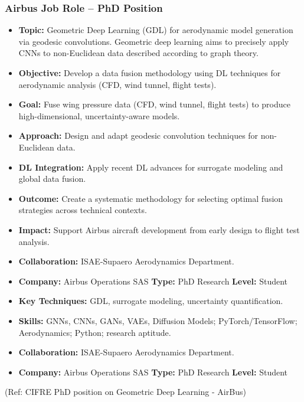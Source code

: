 \begin{frame}[fragile]\frametitle{Airbus Job Role – PhD Position}
  \begin{itemize}
    \item \textbf{Topic:} Geometric Deep Learning (GDL) for aerodynamic model generation via geodesic convolutions. Geometric deep learning aims to precisely apply CNNs to non-Euclidean data described according to graph theory.
    \item \textbf{Objective:} Develop a data fusion methodology using DL techniques for aerodynamic analysis (CFD, wind tunnel, flight tests).
    \item \textbf{Goal:} Fuse wing pressure data (CFD, wind tunnel, flight tests) to produce high-dimensional, uncertainty-aware models.
    \item \textbf{Approach:} Design and adapt geodesic convolution techniques for non-Euclidean data.
    \item \textbf{DL Integration:} Apply recent DL advances for surrogate modeling and global data fusion.
    \item \textbf{Outcome:} Create a systematic methodology for selecting optimal fusion strategies across technical contexts.
    \item \textbf{Impact:} Support Airbus aircraft development from early design to flight test analysis.
    \item \textbf{Collaboration:} ISAE-Supaero Aerodynamics Department.
    \item \textbf{Company:} Airbus Operations SAS \quad \textbf{Type:} PhD Research \quad \textbf{Level:} Student	
    \item \textbf{Key Techniques:} GDL, surrogate modeling, uncertainty quantification.
    \item \textbf{Skills:} GNNs, CNNs, GANs, VAEs, Diffusion Models; PyTorch/TensorFlow; Aerodynamics; Python; research aptitude.
    \item \textbf{Collaboration:} ISAE-Supaero Aerodynamics Department.
    \item \textbf{Company:} Airbus Operations SAS \quad \textbf{Type:} PhD Research \quad \textbf{Level:} Student
  \end{itemize}
  
  {\tiny (Ref: CIFRE PhD position on Geometric Deep Learning - AirBus)}
\end{frame}


	  
